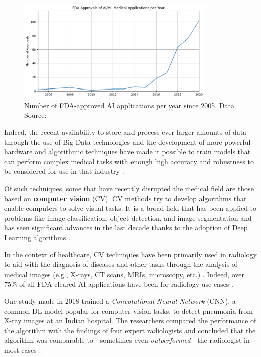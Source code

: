 \documentclass[../main.tex]{subfiles}
\begin{document}
    \begin{figure}[h]
        \centering
        \includegraphics[width=0.85\textwidth]{fda_approved_ml_apps}
        \caption{Number of FDA-approved AI applications per year since 2005. Data Source: \cite{health_artificial_2022}}
        \label{fig:fda_approved_ml_apps}
    \end{figure}
    
    Indeed, the recent availability to store and process ever larger amounts of data through the use of Big Data technologies and the development of more powerful hardware and algorithmic techniques have made it possible to train models that can perform complex medical tasks with enough high accuracy and robustness to be considered for use in that industry
    \cite{topol_high-performance_2019}.

    \vspace{0.75cm}
    
    Of such techniques, some that have recently disrupted the medical field are those based on \textbf{computer vision}  (CV). CV methods try to develop algorithms that enable computers to solve visual tasks. It is a broad field that has been applied to problems like image classification, object detection, and image segmentation and has seen significant advances in the last decade thanks to the adoption of Deep Learning algorithms \cite{lecun_deep_2015}.

    In the context of healthcare, CV techniques have been primarily used in radiology to aid with the diagnosis of diseases and other tasks through the analysis of medical images (e.g., X-rays, CT scans, MRIs, microscopy, etc.) \cite{esteva_deep_2021}. Indeed, over 75\% of all FDA-cleared AI applications have been for radiology use cases \cite{health_artificial_2022}.
    
    One study made in 2018 trained a \textit{Convolutional Neural Network} (CNN), a common DL model popular for computer vision tasks, to detect pneumonia from X-ray images at an Indian hospital. The researchers compared the performance of the algorithm with the findings of four expert radiologists and concluded that the algorithm was comparable to - sometimes even \textit{outperformed} - the radiologist in most cases \cite{wang_chestx-ray8_2017}.
\end{document}
